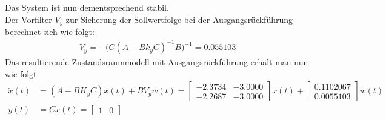 \documentclass[11pt]{scrartcl} %
\begin{document}
Das System ist nun dementsprechend stabil.\\
Der Vorfilter $V_y$ zur Sicherung der Sollwertfolge bei der Ausgangsrückführung berechnet sich wie folgt:
\begin{align*}
	V_y=-\bigl(C(A-Bk_yC)^{-1}B\bigr)^{-1}=0.055103
\end{align*}
Das resultierende Zustandsraummodell mit Ausgangsrückführung erhält man nun wie folgt:
\begin{align*}
	\dot{x}(t)&=(A-BK_yC)x(t)+BV_yw(t)=\begin{bmatrix}-2.3734&-3.0000\\-2.2687&-3.0000\end{bmatrix}x(t)+\begin{bmatrix}0.1102067\\0.0055103\end{bmatrix}w(t)\\
	y(t)&=Cx(t)=\begin{bmatrix}1&0\end{bmatrix}
\end{align*}
\end{document}
